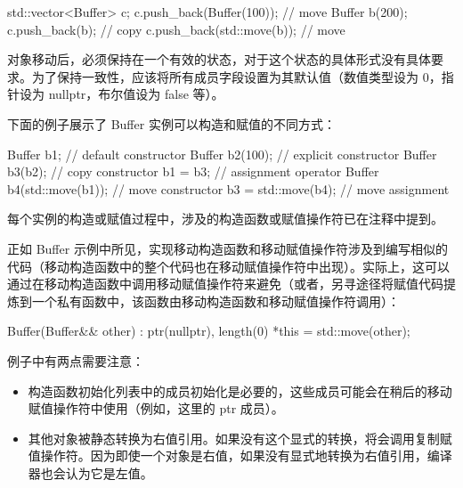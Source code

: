 \begin{cpp}
std::vector<Buffer> c;
c.push_back(Buffer(100));  // move
Buffer b(200);
c.push_back(b);            // copy
c.push_back(std::move(b)); // move
\end{cpp}

对象移动后，必须保持在一个有效的状态，对于这个状态的具体形式没有具体要求。为了保持一致性，应该将所有成员字段设置为其默认值（数值类型设为 0，指针设为 nullptr，布尔值设为 false 等）。

下面的例子展示了 Buffer 实例可以构造和赋值的不同方式：

\begin{cpp}
Buffer b1;                // default constructor
Buffer b2(100);           // explicit constructor
Buffer b3(b2);            // copy constructor
b1 = b3;                  // assignment operator
Buffer b4(std::move(b1)); // move constructor
b3 = std::move(b4);       // move assignment
\end{cpp}

每个实例的构造或赋值过程中，涉及的构造函数或赋值操作符已在注释中提到。


正如 Buffer 示例中所见，实现移动构造函数和移动赋值操作符涉及到编写相似的代码（移动构造函数中的整个代码也在移动赋值操作符中出现）。实际上，这可以通过在移动构造函数中调用移动赋值操作符来避免（或者，另寻途径将赋值代码提炼到一个私有函数中，该函数由移动构造函数和移动赋值操作符调用）：

\begin{cpp}
Buffer(Buffer&& other) : ptr(nullptr), length(0)
{
    *this = std::move(other);
}
\end{cpp}

例子中有两点需要注意：

\begin{itemize}
\item
构造函数初始化列表中的成员初始化是必要的，这些成员可能会在稍后的移动赋值操作符中使用（例如，这里的 ptr 成员）。

\item
其他对象被静态转换为右值引用。如果没有这个显式的转换，将会调用复制赋值操作符。因为即使一个对象是右值，如果没有显式地转换为右值引用，编译器也会认为它是左值。
\end{itemize}




